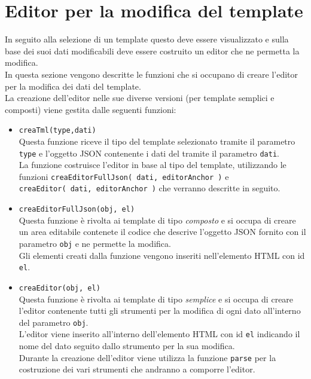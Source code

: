 \section{Editor per la modifica del template}
In seguito alla selezione di un template questo deve essere visualizzato e sulla base dei suoi dati modificabili deve essere costruito un editor che ne permetta la modifica.\\
In questa sezione vengono descritte le funzioni che si occupano di creare l'editor per la modifica dei dati del template.\\
La creazione dell'editor nelle sue diverse versioni (per template semplici e composti) viene gestita dalle seguenti funzioni:
\begin{itemize}
	\item \texttt{creaTml(type,dati)}\\
	Questa funzione riceve il tipo del template selezionato tramite il parametro \texttt{type} e l'oggetto JSON contenente i dati del tramite il parametro \texttt{dati}.\\
	La funzione costruisce l'editor in base al tipo del template, utilizzando le funzioni \texttt{creaEditorFullJson( dati, editorAnchor )} e \\ \texttt{creaEditor( dati, editorAnchor )} che verranno descritte in seguito.
	
	\item \texttt{creaEditorFullJson(obj, el)}\\
	Questa funzione è rivolta ai template di tipo \textit{composto} e si occupa di creare un area editabile contenete il codice che descrive l'oggetto JSON fornito con il parametro \texttt{obj} e ne permette la modifica.\\
	Gli elementi creati dalla funzione vengono inseriti nell'elemento HTML con id \texttt{el}.
	
	\newpage
	\item \texttt{creaEditor(obj, el)}\\
	Questa funzione è rivolta ai template di tipo \textit{semplice} e si occupa di creare l'editor contenente tutti gli strumenti per la modifica di ogni dato all'interno del parametro \texttt{obj}.\\
	L'editor viene inserito all'interno dell'elemento HTML con id \texttt{el} indicando il nome del dato seguito dallo strumento per la sua modifica.\\
	Durante la creazione dell'editor viene utilizza la funzione \texttt{parse} per la costruzione dei vari strumenti che andranno a comporre l'editor.
	

\end{itemize}

